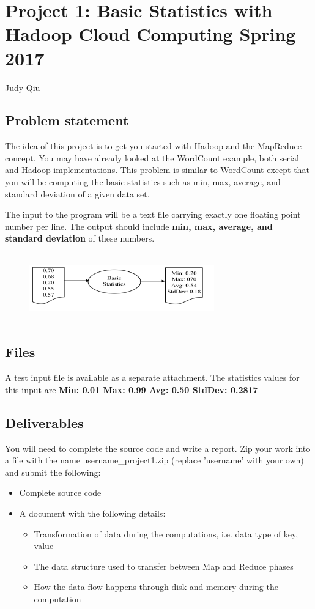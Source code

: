 
\chapter{Project 1: Basic Statistics with Hadoop Cloud Computing
  Spring 2017}       

Judy Qiu

\section*{Problem statement}
 
The idea of this project is to get you started with Hadoop and the MapReduce concept. You may have already looked at the WordCount example, both serial and Hadoop implementations. This problem is similar to WordCount except that you will be computing the basic statistics such as min, max, average, and standard deviation of a given data set.

The input to the program will be a text file carrying exactly one floating point number per line. The output should include \textbf{min, max, average, and standard deviation} of these numbers.

\begin{figure}[!htbp]
\includegraphics[width=8cm,height=3cm]{section/icloud/assignment/problems/project1/p1example.png}
\centering
\end{figure}

\section*{Files}
A test input file is available as a separate attachment.
The statistics values for this input are \textbf{Min: 0.01 Max: 0.99 Avg: 0.50 StdDev: 0.2817}


\section*{Deliverables}
You will need to complete the source code and write a report. Zip your work into a file with the name username\_project1.zip (replace 'username' with your own) and submit the following:
\begin{itemize}
\item Complete source code
\item A document with the following details:
\begin{itemize}
\item	Transformation of data during the computations, i.e. data type of key, value
\item	The data structure used to transfer between Map and Reduce phases
\item	How the data flow happens through disk and memory during the computation
\end{itemize}
\end{itemize}

